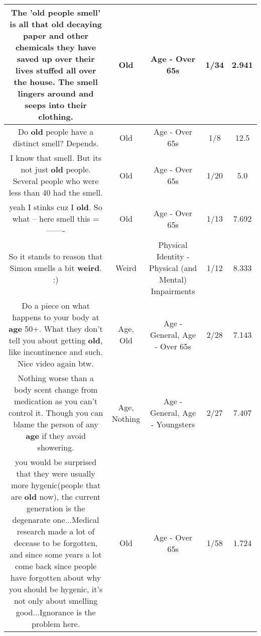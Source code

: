 \documentclass[11pt]{article}
\newlength\mylength
\begin{document}
\begin{center}
\begin{longtable}{|C{.65\mylength}|C{.30\mylength}|C{.12\mylength}|C{.12\mylength}|C{.12\mylength}|}
  \small The '\textbf{old} people smell' is all that \textbf{old} decaying paper and other chemicals they have saved up over their lives stuffed all over the house. The smell lingers around and seeps into their clothing.\normalsize   & Old & Age - Over 65s & 1/34 & 2.941 \\  \hline
  \small Do \textbf{old} people have a distinct smell? Depends.\normalsize   & Old & Age - Over 65s & 1/8 & 12.5 \\  \hline
  \small I know that smell. But its not just \textbf{old} people. Several people who were less than 40 had the smell.\normalsize   & Old & Age - Over 65s & 1/20 & 5.0 \\  \hline
  \small yeah I stinks cuz I \textbf{old}.  So what  -- here smell this =-------\normalsize   & Old & Age - Over 65s & 1/13 & 7.692 \\  \hline
  \small So it stands to reason that Simon smells a bit \textbf{weird}. :)\normalsize   & Weird & Physical Identity - Physical (and Mental) Impairments & 1/12 & 8.333 \\  \hline
  \small Do a piece on what happens to your body at \textbf{age} 50+.  What they don't tell you about getting \textbf{old}, like incontinence and such.  Nice video again btw.\normalsize   & Age, Old & Age - General, Age - Over 65s & 2/28 & 7.143 \\  \hline
  \small Nothing worse than a body scent change from medication as you can't control it. Though you can blame the person of any \textbf{age} if they avoid showering.\normalsize   & Age, Nothing & Age - General, Age - Youngsters & 2/27 & 7.407 \\  \hline
  \small you would be surprised that they were usually more hygenic(people that are \textbf{old} now), the current generation is the degenarate one...Medical research made a lot of decease to be forgotten, and since some years a lot come back since people have forgotten about why you should be hygenic, it's not only about smelling good...Ignorance is the problem here.\normalsize   & Old & Age - Over 65s & 1/58 & 1.724 \\  \hline

\end{longtable}
\end{center}
\end{document}

